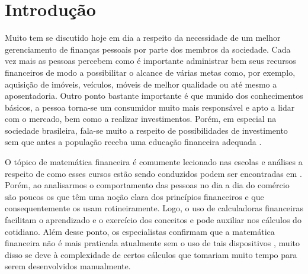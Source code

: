 \chapter{Introdução}




Muito tem se discutido hoje em dia a respeito da necessidade de um melhor gerenciamento de finanças pessoais por parte dos membros da sociedade. Cada vez mais as pessoas percebem como é importante administrar bem seus recursos financeiros de modo a possibilitar o alcance de várias metas como, por exemplo, aquisição de imóveis, veículos, móveis de melhor qualidade ou até mesmo a aposentadoria. Outro ponto bastante importante é que munido dos conhecimentos básicos, a pessoa torna-se um consumidor muito mais responsável e apto a lidar com o mercado, bem como a realizar investimentos. Porém, em especial na sociedade brasileira, fala-se muito a respeito de possibilidades de investimento sem que antes a população receba uma educação financeira adequada \cite{valoreducacao}. 

O tópico de matemática financeira é comumente lecionado nas escolas e análises a res\-peito de como esses cursos estão sendo conduzidos podem ser encontradas em \cite{educacaoMedio}. Porém, ao analisarmos o comportamento das pessoas no dia a dia do comércio são poucos os que têm uma noção clara dos princípios financeiros e que consequentemente os usam rotineiramente. Logo, o uso de calculadoras financeiras facilitam o aprendizado e o exercício dos conceitos e pode auxiliar nos cálculos do cotidiano. Além desse ponto, os especialistas confirmam que a matemática financeira não é mais praticada atualmente sem o uso de tais dispositivos \cite{matFinanceira}, muito disso se deve à complexidade de certos cálculos que tomariam muito tempo para serem desenvolvidos manualmente.

